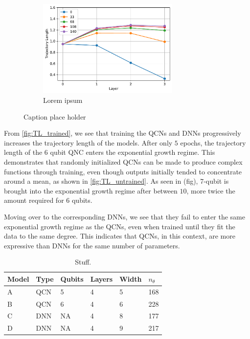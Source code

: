 \begin{figure}[H]
\begin{subfigure}[t]{0.5\textwidth}
    \end{subfigure}%
    \hfill 
    \begin{subfigure}[t]{0.5\textwidth}
        \centering
        \includegraphics[height=1.9in]{latex/figures/TL_trained_DNN_nodes_9.pdf}
        \caption{Lorem ipsum}
    \end{subfigure}
    \caption{Caption place holder}
    \label{fig:TL_trained}
\end{figure}

From \autoref{fig:TL_trained}, we see that training the QCNs and DNNs progressively increases the trajectory length of the models. After only $5$ epochs, the trajectory length of the 6 qubit QNC enters the exponential growth regime. This demonstrates that randomly initialized QCNs can be made to produce complex functions through training, even though outputs initially tended to concentrate around a mean, as shown in \autoref{fig:TL_untrained}. As seen in (fig), 7-qubit is brought into the exponential growth regime after between $10$, more twice the amount required for 6 qubits. 

Moving over to the corresponding DNNs, we see that they fail to enter the same exponential growth regime as the QCNs, even when trained until they fit the data to the same degree. This indicates that QCNs, in this context, are more expressive than DNNs for the same number of parameters.  

\begin{table}[H]
\centering
\begin{tabular}{|l|l|l|l|l|l|}
\hline
Model &Type & Qubits& Layers & Width &$n_{\theta}$ \\ \hline
A    & QCN & 5 &  4 & 5& 168   \\ \hline
B    & QCN & 6 &  4 & 6& 228 \\ \hline
C    & DNN & NA&  4 & 8& 177  \\ \hline
D    & DNN & NA&  4 & 9& 217  \\ \hline
\end{tabular}
\caption{Stuff.} 
\label{tab:TL models}
\end{table}

